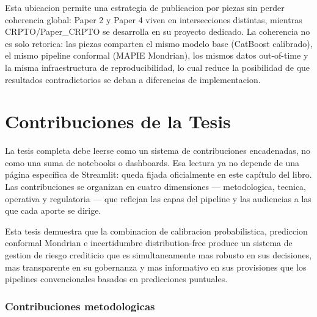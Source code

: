 \documentclass[
  spanish,
  11pt,
  letterpaper,
]{scrbook}
\theoremstyle{plain}
\theoremstyle{remark}
\begin{document}
Esta ubicacion permite una estrategia de publicacion por piezas sin
perder coherencia global: Paper 2 y Paper 4 viven en intersecciones
distintas, mientras CRPTO/Paper\_CRPTO se desarrolla en su proyecto
dedicado. La coherencia no es solo retorica: las piezas comparten el
mismo modelo base (CatBoost calibrado), el mismo pipeline conformal
(MAPIE Mondrian), los mismos datos out-of-time y la misma
infraestructura de reproducibilidad, lo cual reduce la posibilidad de
que resultados contradictorios se deban a diferencias de implementacion.

\chapter{Contribuciones de la Tesis}\label{sec-contributions}

La tesis completa debe leerse como un sistema de contribuciones
encadenadas, no como una suma de notebooks o dashboards. Esa lectura ya
no depende de una página específica de Streamlit: queda fijada
oficialmente en este capítulo del libro. Las contribuciones se organizan
en cuatro dimensiones --- metodologica, tecnica, operativa y regulatoria
--- que reflejan las capas del pipeline y las audiencias a las que cada
aporte se dirige.

\begin{tcolorbox}[enhanced jigsaw, arc=.35mm, bottomrule=.15mm, bottomtitle=1mm, breakable, colback=white, colbacktitle=quarto-callout-tip-color!10!white, colframe=quarto-callout-tip-color-frame, coltitle=black, left=2mm, leftrule=.75mm, opacityback=0, opacitybacktitle=0.6, rightrule=.15mm, title=\textcolor{quarto-callout-tip-color}{\faLightbulb}\hspace{0.5em}{La tesis en una oracion}, titlerule=0mm, toprule=.15mm, toptitle=1mm]

Esta tesis demuestra que la combinacion de calibracion probabilistica,
prediccion conformal Mondrian e incertidumbre distribution-free produce
un sistema de gestion de riesgo crediticio que es simultaneamente mas
robusto en sus decisiones, mas transparente en su gobernanza y mas
informativo en sus provisiones que los pipelines convencionales basados
en predicciones puntuales.

\end{tcolorbox}

\subsection{Contribuciones
metodologicas}\label{sec-contrib-methodological}
\end{document}
